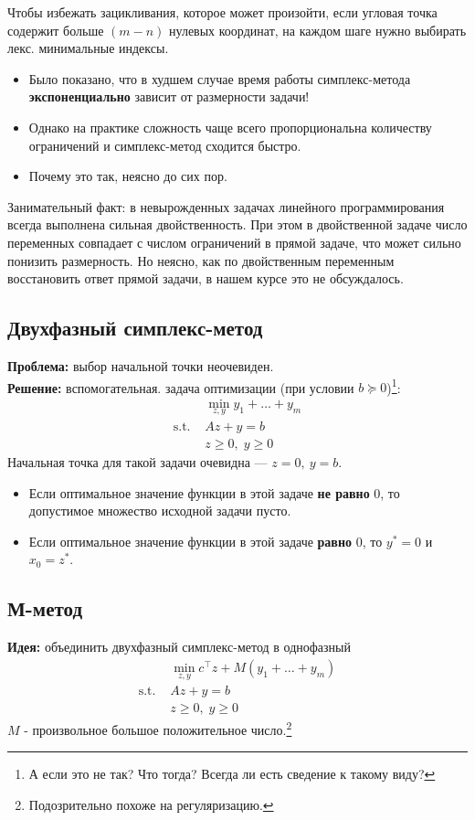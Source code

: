 \documentclass[11pt,a4paper]{report}
\theoremstyle{definition}
\theoremstyle{definition}
\theoremstyle{definition}
\begin{document}
	Чтобы избежать зацикливания, которое может произойти, если угловая точка содержит больше $ (m - n) $ нулевых координат, на каждом шаге нужно выбирать лекс. минимальные индексы.\\
	\begin{itemize}[$\diamond$]
		\item Было показано, что в худшем случае время работы симплекс-метода \textbf{экспоненциально} зависит от размерности задачи!
		\item Однако на практике сложность чаще всего пропорциональна количеству ограничений и симплекс-метод сходится быстро.
		\item Почему это так, неясно до сих пор.
	\end{itemize}
	Занимательный факт: в невырожденных задачах линейного программирования всегда выполнена сильная двойственность. При этом в двойственной задаче число переменных совпадает с числом ограничений в прямой задаче, что может сильно понизить размерность. Но неясно, как по двойственным переменным восстановить ответ прямой задачи, в нашем курсе это не обсуждалось.
	\subsection{Двухфазный симплекс-метод}
	\noindent \textbf{Проблема:} выбор начальной точки неочевиден.\\
	\textbf{Решение:} вспомогательная. задача оптимизации (при условии $ b \succeq 0 $)\footnote{А если это не так? Что тогда? Всегда ли есть сведение к такому виду?}:
	\begin{align*}
		& \min_{z, y} y_1 + \ldots + y_m \\
		\text{s.t. } & Az + y = b\\
		& z \geq 0, \; y \geq 0
	\end{align*}
	Начальная точка для такой задачи очевидна — $ z = 0,\ y = b $.
	\begin{itemize}[$\diamond$]
		\item Если оптимальное значение функции в этой задаче \textbf{не равно} $0$, то допустимое множество исходной задачи пусто.
		\item Если оптимальное значение функции в этой задаче \textbf{равно} $0$, то $y^* = 0$ и $x_0 = z^*$.
	\end{itemize}
	\subsection{М-метод}
	\textbf{Идея: } объединить двухфазный симплекс-метод в однофазный
	\begin{align*}
		& \min_{z, y} c^{\top}z + M(y_1 + \ldots + y_m) \\
		\text{s.t. } & Az + y = b\\
		& z \geq 0, \; y \geq 0
	\end{align*} 
	$M$ - произвольное большое положительное число.\footnote{Подозрительно похоже на регуляризацию.}
\end{document}
